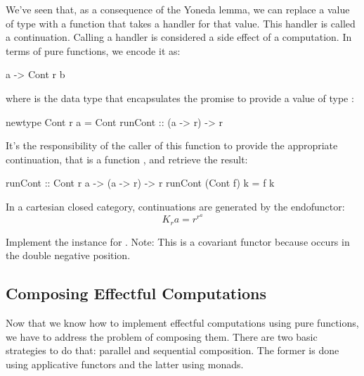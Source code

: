 \documentclass[DaoFP]{subfiles}
\begin{document}
We've seen that, as a consequence of the Yoneda lemma, we can replace a value of type  with a function that takes a handler for that value. This handler is called a continuation. Calling a handler is considered a side effect of a computation. In terms of pure functions, we encode it as:
\begin{haskell}
a -> Cont r b
\end{haskell}
where  is the data type that encapsulates the promise to provide a value of type :
\begin{haskell}
newtype Cont r a = Cont { runCont :: (a -> r) -> r }
\end{haskell}
It's the responsibility of the caller of this function to provide the appropriate continuation, that is a function , and retrieve the result:
\begin{haskell}
runCont :: Cont r a -> (a -> r) -> r
runCont (Cont f) k = f k
\end{haskell}

In a cartesian closed category, continuations are generated by the endofunctor:
\[ K_r a = r^{r^a} \]

\begin{exercise}
Implement the  instance for . Note: This is a covariant functor because  occurs in the double negative position.
\end{exercise}

\subsection{Composing Effectful Computations}

Now that we know how to implement effectful computations using pure functions, we have to address the problem of composing them. There are two basic strategies to do that: parallel and sequential composition. The former is done using applicative functors and the latter using monads. 
\end{document}
